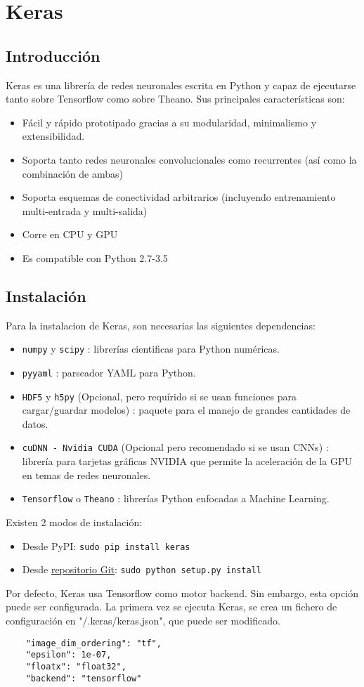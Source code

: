\chapter{Keras}
\section{Introducción}
Keras es una librería de redes neuronales escrita en Python y capaz de ejecutarse tanto sobre Tensorflow como sobre Theano. Sus principales características son:
\begin{itemize}[noitemsep]
\item Fácil y rápido prototipado gracias a su modularidad, minimalismo y extensibilidad.
\item Soporta tanto redes neuronales convolucionales como recurrentes (así como la combinación de ambas)
\item Soporta esquemas de conectividad arbitrarios (incluyendo entrenamiento multi-entrada y multi-salida)
\item Corre en CPU y GPU
\item Es compatible con Python 2.7-3.5
 \end{itemize}

 \section{Instalación}
 Para la instalacion de Keras, son necesarias las siguientes dependencias:
 \begin{itemize}[noitemsep]
\item \lstinline{numpy} y \lstinline{scipy} : librerías cientificas para Python numéricas.
\item \lstinline{pyyaml} : parseador YAML para Python.
\item \lstinline{HDF5} y \lstinline{h5py} (Opcional, pero requírido si se usan funciones para cargar/guardar modelos) : paquete para el manejo de grandes cantidades de datos.
\item \lstinline{cuDNN - Nvidia CUDA} (Opcional pero recomendado si se usan CNNs) : librería para tarjetas gráficas NVIDIA que permite la aceleración de la GPU en temas de redes neuronales.
\item \lstinline{Tensorflow} o \lstinline{Theano} : librerías Python enfocadas a Machine Learning.
 \end{itemize}
Existen 2 modos de instalación:
 \begin{itemize}[noitemsep]
 \item Desde PyPI: \lstinline{sudo pip install keras}
 \item Desde \href{https://github.com/fchollet/keras/tree/master/keras}{repositorio Git}: \lstinline{sudo python setup.py install}
 \end{itemize}
 Por defecto, Keras usa Tensorflow como motor backend. Sin embargo, esta opción puede ser configurada. La primera vez se ejecuta Keras, se crea un fichero de configuración en "/.keras/keras.json", que puede ser modificado.
\begin{lstlisting}
    "image_dim_ordering": "tf",
    "epsilon": 1e-07,
    "floatx": "float32",
    "backend": "tensorflow"
\end{lstlisting}

